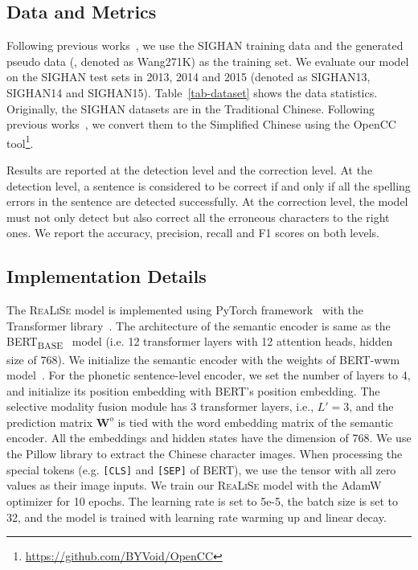 \documentclass[11pt,a4paper]{article}
\newcommand\model{\textsc{ReaLiSe}}
\begin{document}
\subsection{Data and Metrics}

Following previous works~\citep{pointer-spell, spellgcn}, we use the SIGHAN training data and the generated pseudo data (\citealp{spell-corpus}, denoted as Wang271K) as the training set. We evaluate our model on the SIGHAN test sets in 2013, 2014 and 2015 (denoted as SIGHAN13, SIGHAN14 and SIGHAN15). Table~\ref{tab-dataset} shows the data statistics. Originally, the SIGHAN datasets are in the Traditional Chinese.
Following previous works~\citep{pointer-spell, spellgcn,softmask-spell}, we convert them to the Simplified Chinese using the OpenCC  tool\footnote{\url{https://github.com/BYVoid/OpenCC}}. 




Results are reported at the detection level and the correction level.
At the detection level, a sentence is considered to be correct if and only if all the spelling errors in the sentence are detected successfully. 
At the correction level, the model must not only detect but also correct all the erroneous characters to the right ones.
We report the accuracy, precision, recall and F1 scores on both levels.


\subsection{Implementation Details}
\label{ssec:details}
The \model{} model is implemented using PyTorch framework~\citep{pytorch} with the Transformer library~\citep{hug-trans}. The architecture of the semantic encoder is same as the BERT\textsubscript{BASE}~\citep{bert} model (i.e. 12 transformer layers with 12 attention heads, hidden size of 768). We initialize the semantic encoder with the weights of BERT-wwm model~\citep{bert-wwm}.
For the phonetic sentence-level encoder, we set the number of layers to 4, and initialize its position embedding with BERT's position embedding.
The selective modality fusion module has 3 transformer layers, i.e., $L'=3$, and the prediction matrix $\mathbf{W}^o$ is tied with the word embedding matrix of the semantic encoder.
All the embeddings and hidden states have the dimension of 768. 
We use the Pillow library to extract the Chinese character images. When processing the special tokens (e.g. \texttt{[CLS]} and \texttt{[SEP]} of BERT), we use the tensor with all zero values as their image inputs.
We train our \model{} model with the AdamW~\citep{adamw} optimizer for 10 epochs. The learning rate is set to 5e-5, the batch size is set to 32, and the model is trained with learning rate warming up and linear decay.
\end{document}
